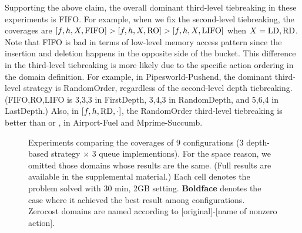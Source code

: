 Supporting the above claim, the overall dominant third-level tiebreaking
in these experiments is FIFO.  For example, when we fix the second-level
tiebreaking, the coverages are $[f,h,X,\mbox{FIFO}]>[f,h,X,\mbox{RO}]>[f,h,X,\mbox{LIFO}]$
when $X=\mbox{LD},\mbox{RD}$.  Note that FIFO is bad in terms of low-level memory
access pattern since the insertion and deletion happens in the opposite
side of the bucket.  This difference in the third-level tiebreaking is
more likely due to the specific action ordering in the domain
definition.  For example, in Pipesworld-Pushend, the dominant
third-level strategy is RandomOrder, regardless of the second-level
depth tiebreaking.  (FIFO,RO,LIFO is 3,3,3 in FirstDepth, 3,4,3 in
RandomDepth, and 5,6,4 in LastDepth.) Also, in $[f,h,\mbox{RD},\cdot]$, the
RandomOrder third-level tiebreaking is better than \lifo or \fifo, in
Airport-Fuel and Mprime-Succumb.

% 



\begin{figure}[htb]
 \centering
 
 \caption{Experiments
 comparing the coverages of 9 configurations (3 depth-based strategy
 $\times$ 3 queue implementions). For the space reason, we omitted those
 domains whose results are the same. (Full results are available in the
 supplemental material.) Each cell denotes the problem solved with 30
 min, 2GB setting. \textbf{Boldface} denotes the case where it achieved
 the best result among configurations. Zerocost domains are named
 according to [original]-[name of nonzero action].}
 \label{depth}
\end{figure}

